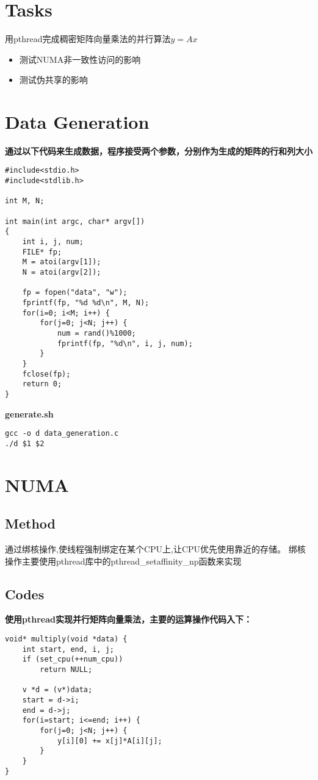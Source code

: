 \documentclass{article}
\title{
    \centering\textbf{ \hmwkTitle}
    \author{\hmwkAuthorName}
}
\begin{document}
\maketitle

\section{Tasks}
用pthread完成稠密矩阵向量乘法的并行算法$y=Ax$
\begin{itemize}
    \item 测试NUMA非一致性访问的影响
    \item 测试伪共享的影响
\end{itemize}

\section{Data Generation}
\textbf{通过以下代码来生成数据，程序接受两个参数，分别作为生成的矩阵的行和列大小}
\begin{lstlisting}
#include<stdio.h>
#include<stdlib.h>

int M, N;

int main(int argc, char* argv[])
{
    int i, j, num;
    FILE* fp;
    M = atoi(argv[1]);
    N = atoi(argv[2]);
    
    fp = fopen("data", "w");
    fprintf(fp, "%d %d\n", M, N);
    for(i=0; i<M; i++) {
        for(j=0; j<N; j++) {
            num = rand()%1000;
            fprintf(fp, "%d\n", i, j, num);
        }
    }
    fclose(fp);
    return 0;
}
\end{lstlisting}

\textbf{generate.sh}

\begin{lstlisting}
gcc -o d data_generation.c
./d $1 $2
\end{lstlisting}


\section{NUMA}
\subsection{Method}
通过绑核操作,使线程强制绑定在某个CPU上,让CPU优先使用靠近的存储。
绑核操作主要使用pthread库中的pthread\_setaffinity\_np函数来实现
\subsection{Codes}
\textbf{使用pthread实现并行矩阵向量乘法，主要的运算操作代码入下：}
\begin{lstlisting}
void* multiply(void *data) {
    int start, end, i, j;
    if (set_cpu(++num_cpu)) 
        return NULL;
    
    v *d = (v*)data;
    start = d->i;
    end = d->j;
    for(i=start; i<=end; i++) {
        for(j=0; j<N; j++) {
            y[i][0] += x[j]*A[i][j];
        }
    }
}
\end{lstlisting}
\end{document}

